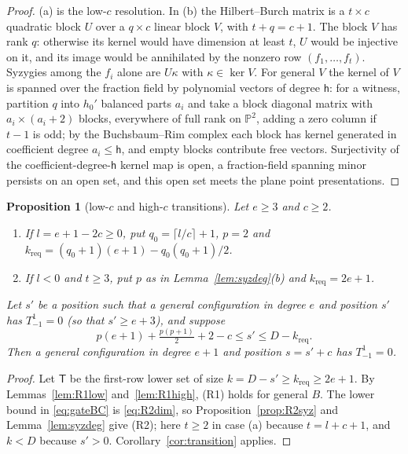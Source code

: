 \documentclass{amsart}
\newtheorem{proposition}[theorem]{Proposition}
\theoremstyle{definition}
\theoremstyle{remark}
\numberwithin{equation}{section}
\newcommand{\PP}{\mathbb{P}}
\begin{document}
\begin{proof}
(a) is the low-$c$ resolution. In (b) the Hilbert--Burch matrix is a $t\times c$ quadratic
block $U$ over a $q\times c$ linear block $V$, with $t+q=c+1$. The block $V$ has rank $q$:
otherwise its kernel would have dimension at least $t$, $U$ would be injective on it,
and its image would be annihilated by the nonzero row $(f_1,\dots,f_t)$. Syzygies among
the $f_i$ alone are $U\kappa$ with $\kappa\in\ker V$. For general $V$ the kernel of
$V$ is spanned over the fraction field by polynomial vectors of degree $\mathsf h$: for
a witness, partition $q$ into $h_0'$ balanced parts $a_i$ and take a block diagonal matrix
with $a_i\times(a_i+2)$ blocks, everywhere of full rank on $\PP^2$, adding a zero column if
$t-1$ is odd; by the Buchsbaum--Rim complex each block has kernel generated in coefficient
degree $a_i\le\mathsf h$, and empty blocks contribute free vectors. Surjectivity of the
coefficient-degree-$\mathsf h$ kernel map is open, a fraction-field spanning minor
persists on an open set, and this open set meets the plane point presentations.
\end{proof}

\begin{proposition}[low-$c$ and high-$c$ transitions]\label{prop:gatesBC}
Let $e\ge3$ and $c\ge2$.
\begin{enumerate}[label=\textup{(\alph*)}]
\item If $l=e+1-2c\ge0$, put $q_0=\lceil l/c\rceil+1$, $p=2$ and
$k_{\mathrm{req}}=(q_0+1)(e+1)-q_0(q_0+1)/2$.
\item If $l<0$ and $t\ge3$, put $p$ as in Lemma~\ref{lem:syzdeg}(b) and $k_{\mathrm{req}}=2e+1$.
\end{enumerate}
Let $s'$ be a position such that a general configuration in degree $e$ and position
$s'$ has $T^1_{-1}=0$ (so that $s'\ge e+3$), and suppose
\begin{equation}\label{eq:gateBC}
  p(e+1)+\tfrac{p(p+1)}2+2-c\le s'\le D-k_{\mathrm{req}} .
\end{equation}
Then a general configuration in degree $e+1$ and position $s=s'+c$ has $T^1_{-1}=0$.
\end{proposition}

\begin{proof}
Let $\mathsf T$ be the first-row lower set of size $k=D-s'\ge k_{\mathrm{req}}\ge2e+1$. By
Lemmas~\ref{lem:R1low} and~\ref{lem:R1high}, (R1) holds for general $B$. The lower bound
in \eqref{eq:gateBC} is \eqref{eq:R2dim}, so Proposition~\ref{prop:R2syz} and
Lemma~\ref{lem:syzdeg} give (R2); here $t\ge2$ in case (a) because $t=l+c+1$, and
$k<D$ because $s'>0$. Corollary~\ref{cor:transition} applies.
\end{proof}
\end{document}
